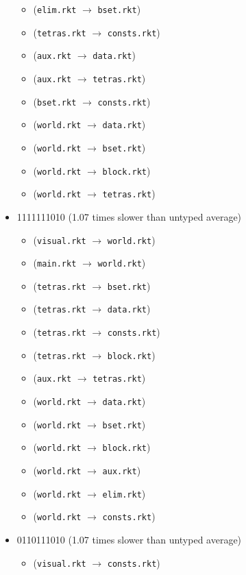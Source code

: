 \documentclass{article}
\newcommand{\mono}[1]{\texttt{#1}}
\begin{document}
\begin{itemize}
\begin{itemize}
  \item (\mono{elim.rkt} $\rightarrow$ \mono{bset.rkt})
  \item (\mono{tetras.rkt} $\rightarrow$ \mono{consts.rkt})
  \item (\mono{aux.rkt} $\rightarrow$ \mono{data.rkt})
  \item (\mono{aux.rkt} $\rightarrow$ \mono{tetras.rkt})
  \item (\mono{bset.rkt} $\rightarrow$ \mono{consts.rkt})
  \item (\mono{world.rkt} $\rightarrow$ \mono{data.rkt})
  \item (\mono{world.rkt} $\rightarrow$ \mono{bset.rkt})
  \item (\mono{world.rkt} $\rightarrow$ \mono{block.rkt})
  \item (\mono{world.rkt} $\rightarrow$ \mono{tetras.rkt})
  \end{itemize}
\item 1111111010 (1.07 times slower than untyped average)
  \begin{itemize}
  \item (\mono{visual.rkt} $\rightarrow$ \mono{world.rkt})
  \item (\mono{main.rkt} $\rightarrow$ \mono{world.rkt})
  \item (\mono{tetras.rkt} $\rightarrow$ \mono{bset.rkt})
  \item (\mono{tetras.rkt} $\rightarrow$ \mono{data.rkt})
  \item (\mono{tetras.rkt} $\rightarrow$ \mono{consts.rkt})
  \item (\mono{tetras.rkt} $\rightarrow$ \mono{block.rkt})
  \item (\mono{aux.rkt} $\rightarrow$ \mono{tetras.rkt})
  \item (\mono{world.rkt} $\rightarrow$ \mono{data.rkt})
  \item (\mono{world.rkt} $\rightarrow$ \mono{bset.rkt})
  \item (\mono{world.rkt} $\rightarrow$ \mono{block.rkt})
  \item (\mono{world.rkt} $\rightarrow$ \mono{aux.rkt})
  \item (\mono{world.rkt} $\rightarrow$ \mono{elim.rkt})
  \item (\mono{world.rkt} $\rightarrow$ \mono{consts.rkt})
  \end{itemize}
\item 0110111010 (1.07 times slower than untyped average)
  \begin{itemize}
  \item (\mono{visual.rkt} $\rightarrow$ \mono{consts.rkt})

\end{itemize}
\end{itemize}
\end{document}
